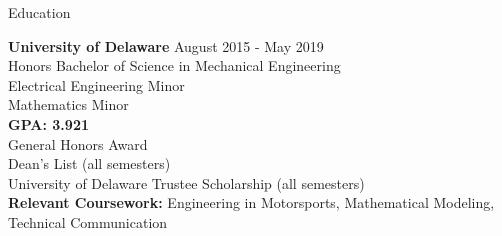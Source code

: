 \documentclass{resume} %
\begin{document}
  



\begin{rSection}{Education}

{\bf University of Delaware} \hfill {August 2015 - May 2019}
\\ 
Honors Bachelor of Science in Mechanical Engineering
\\
Electrical Engineering Minor
\\
Mathematics Minor 
\\
{\bf GPA: 3.921}   
\\ General Honors Award
\\ Dean's List (all semesters)
\\ University of Delaware Trustee Scholarship (all semesters)
\\{\bf Relevant Coursework:} Engineering in Motorsports, Mathematical Modeling, Technical Communication

\end{rSection} 



\end{document}

